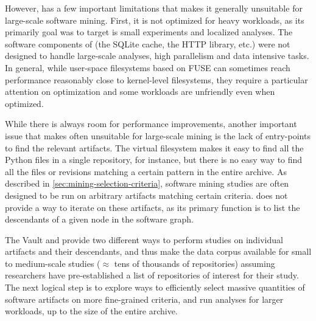However, \SWHFS{} has a few important limitations that makes it generally
unsuitable for large-scale software mining. First, it is not optimized for
heavy workloads, as its primarily goal was to target is small experiments and
localized analyses. The software components of \SWHFS{} (the SQLite cache, the
HTTP library, etc.) were not designed to handle large-scale analyses, high
parallelism and data intensive tasks. In general, while user-space filesystems
based on FUSE can sometimes reach performance reasonably close to kernel-level
filesystems, they require a particular attention on optimization and some
workloads are unfriendly even when optimized\cite{vangoor2017fuseperf}.

While there is always room for performance improvements, another important
issue that makes \SWHFS{} often unsuitable for large-scale mining is the lack of
entry-points to find the relevant artifacts. The virtual filesystem makes
it easy to find all the Python files in a single repository, for instance,
but there is no easy way to find all the files or revisions matching a certain
pattern in the entire archive. As described in
\cref{sec:mining-selection-criteria}, software mining studies are often
designed to be run on arbitrary artifacts matching certain criteria. \SWHFS{}
does not provide a way to iterate on these artifacts, as its primary function
is to list the descendants of a given node in the software graph.

The Vault and \SWHFS{} provide two different ways to perform studies on
individual artifacts and their descendants, and thus make the data corpus
available for small to medium-scale studies ($\approx$ tens of thousands of
repositories) assuming researchers have pre-established a list of repositories
of interest for their study.
The next logical step is to explore ways to efficiently select massive
quantities of software artifacts on more fine-grained criteria, and
run analyses for larger workloads, up to the size of the entire archive.

